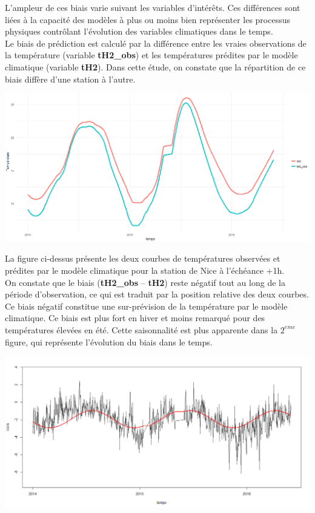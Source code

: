 \documentclass[14pt, openany]{article}
\begin{document}
L'ampleur de ces biais varie suivant les variables d'intérêts. Ces différences sont liées à la capacité des modèles à plus ou moins bien représenter les processus physiques contrôlant l'évolution des variables climatiques dans le temps.\\
Le biais de prédiction est calculé par la différence entre les vraies observations de la température (variable \textbf{tH2\_obs}) et les températures prédites par le modèle climatique (variable \textbf{tH2}).
Dans cette étude, on constate que la répartition de ce biais diffère d'une station à l'autre.
\begin{center}
\includegraphics[width=17cm]{Images/biais_nice.png}
\end{center}
La figure ci-dessus présente les deux courbes de températures observées et prédites par le modèle climatique pour la station de Nice à l'échéance +1h.\\
On constate que le biais (\textbf{tH2\_obs} – \textbf{tH2}) reste négatif tout au long de la période d'observation, ce qui est traduit par la position relative des deux courbes. Ce biais négatif constitue une sur-prévision de la température par le modèle climatique. Ce biais est plus fort en hiver et moins remarqué pour des températures élevées en été. Cette saisonnalité est plus apparente dans la $2^{eme}$ figure, qui représente l'évolution du biais dans le temps.
\begin{center}
\includegraphics[width=17cm]{Images/evol_biais.png}
\end{center}
\end{document}

